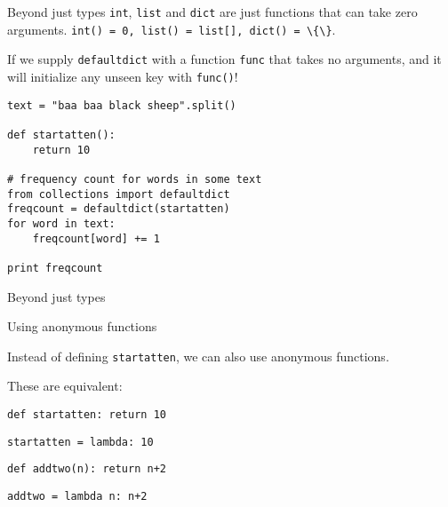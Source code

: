 \documentclass{beamer}
\begin{document}
\begin{frame}{Beyond just types}
 \lstinline$int$, \lstinline$list$ and \lstinline$dict$ are just functions that can take zero arguments.
 \lstinline$int() = 0, list() = list[], dict() = \{\}$.

 \bigskip

 If we supply \lstinline$defaultdict$ with a function \lstinline$func$ that takes no arguments,
 and it will initialize any unseen key with \lstinline$func()$!
\end{frame}

\begin{lrbox}{\mysavebox}
\begin{lstlisting}
text = "baa baa black sheep".split()

def startatten():
    return 10

# frequency count for words in some text
from collections import defaultdict
freqcount = defaultdict(startatten)
for word in text:
    freqcount[word] += 1

print freqcount 
\end{lstlisting}
\end{lrbox}

\begin{frame}{Beyond just types}
 
\vspace{1.5em}
{\usebox{\mysavebox}}


\vspace{1em}
\end{frame}

\begin{frame}{Using anonymous functions}


Instead of defining \lstinline$startatten$, we can also use anonymous functions.

\bigskip

These are equivalent:

\bigskip

\lstinline$def startatten: return 10$

\lstinline$startatten = lambda: 10$

\bigskip

\lstinline$def addtwo(n): return n+2 $

\lstinline$addtwo = lambda n: n+2$

\end{frame}
\end{document}
